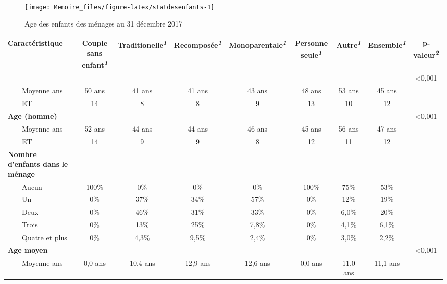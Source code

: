 \documentclass[
  12pt,
]{book}
\begin{document}
\begin{figure}[h]

{\centering \texttt{[image: Memoire\_files/figure-latex/statdesenfants-1]} 

}

\caption{Age des enfants des ménages au 31 décembre 2017}\label{fig:statdesenfants}
\end{figure}

\begingroup
\fontsize{9.8pt}{11.7pt}\selectfont
\setlength{\LTpost}{0mm}
\begin{longtable}{lcccccccc}
\toprule
\textbf{Caractéristique} & \textbf{Couple sans enfant}\textsuperscript{\textit{1}} & \textbf{Traditionelle}\textsuperscript{\textit{1}} & \textbf{Recomposée}\textsuperscript{\textit{1}} & \textbf{Monoparentale}\textsuperscript{\textit{1}} & \textbf{Personne seule}\textsuperscript{\textit{1}} & \textbf{Autre}\textsuperscript{\textit{1}} & \textbf{Ensemble}\textsuperscript{\textit{1}} & \textbf{p-valeur}\textsuperscript{\textit{2}} \\ 
\midrule\addlinespace[2.5pt]
{\bfseries Age (femme)} &  &  &  &  &  &  &  & <0,001 \\ 
    Moyenne ans & 50 ans & 41 ans & 41 ans & 43 ans & 48 ans & 53 ans & 45 ans &  \\ 
    ET & 14 & 8 & 8 & 9 & 13 & 10 & 12 &  \\ 
{\bfseries Age (homme)} &  &  &  &  &  &  &  & <0,001 \\ 
    Moyenne ans & 52 ans & 44 ans & 44 ans & 46 ans & 45 ans & 56 ans & 47 ans &  \\ 
    ET & 14 & 9 & 9 & 8 & 12 & 11 & 12 &  \\ 
{\bfseries Nombre d'enfants dans le ménage} &  &  &  &  &  &  &  &  \\ 
    Aucun & 100\% & 0\% & 0\% & 0\% & 100\% & 75\% & 53\% &  \\ 
    Un & 0\% & 37\% & 34\% & 57\% & 0\% & 12\% & 19\% &  \\ 
    Deux & 0\% & 46\% & 31\% & 33\% & 0\% & 6,0\% & 20\% &  \\ 
    Trois & 0\% & 13\% & 25\% & 7,8\% & 0\% & 4,1\% & 6,1\% &  \\ 
    Quatre et plus & 0\% & 4,3\% & 9,5\% & 2,4\% & 0\% & 3,0\% & 2,2\% &  \\ 
{\bfseries Age moyen} &  &  &  &  &  &  &  & <0,001 \\ 
    Moyenne ans & 0,0 ans & 10,4 ans & 12,9 ans & 12,6 ans & 0,0 ans & 11,0 ans & 11,1 ans &  \\ 

\end{longtable}
\end{document}
